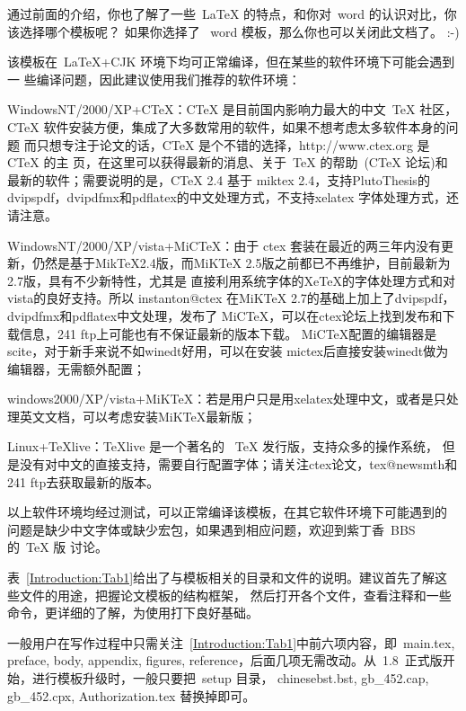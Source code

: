 通过前面的介绍，你也了解了一些~LaTeX 的特点，和你对~word 的认识对比，你该选择哪个模板呢？
如果你选择了 ~word 模板，那么你也可以关闭此文档了。 :-)

该模板在~\LaTeX{}+CJK 环境下均可正常编译，但在某些的软件环境下可能会遇到一
些编译问题，因此建议使用我们推荐的软件环境：
\begin{hitlist}
\item WindowsNT/2000/XP+CTeX：CTeX 是目前国内影响力最大的中文~TeX 社区，CTeX
软件安装方便，集成了大多数常用的软件，如果不想考虑太多软件本身的问题
而只想专注于论文的话，CTeX 是个不错的选择，http://www.ctex.org 是~ CTeX 的主
页，在这里可以获得最新的消息、关于~TeX 的帮助~(CTeX
论坛)和最新的软件；需要说明的是，CTeX 2.4 基于 miktex 2.4，支持PlutoThesis的dvipspdf，dvipdfmx和pdflatex的中文处理方式，不支持xelatex 字体处理方式，还请注意。
\item WindowsNT/2000/XP/vista+MiCTeX：由于 ctex 套装在最近的两三年内没有更新，仍然是基于MikTeX2.4版，而MiKTeX 2.5版之前都已不再维护，目前最新为2.7版，具有不少新特性，尤其是 直接利用系统字体的XeTeX的字体处理方式和对vista的良好支持。所以 instanton@ctex 在MiKTeX 2.7的基础上加上了dvipspdf，dvipdfmx和pdflatex中文处理，发布了 MiCTeX，可以在ctex论坛上找到发布和下载信息，241 ftp上可能也有不保证最新的版本下载。 MiCTeX配置的编辑器是scite，对于新手来说不如winedt好用，可以在安装 mictex后直接安装winedt做为编辑器，无需额外配置；
\item windows2000/XP/vista+MiKTeX：若是用户只是用xelatex处理中文，或者是只处理英文文档，可以考虑安装MiKTeX最新版；
\item Linux+TeXlive：TeXlive 是一个著名的~ TeX 发行版，支持众多的操作系统，
但是没有对中文的直接支持，需要自行配置字体；请关注ctex论文，tex@newsmth和241 ftp去获取最新的版本。
\end{hitlist}

以上软件环境均经过测试，可以正常编译该模板，在其它软件环境下可能遇到的
问题是缺少中文字体或缺少宏包，如果遇到相应问题，欢迎到紫丁香~BBS 的~TeX 版
讨论。


表~\ref{Introduction:Tab1}给出了与模板相关的目录和文件的说明。建议首先了解这些文件的用途，把握论文模板的结构框架，
然后打开各个文件，查看注释和一些命令，更详细的了解，为使用打下良好基础。

一般用户在写作过程中只需关注~\ref{Introduction:Tab1}中前六项内容，即~main.tex, preface, body, appendix,
figures, reference，后面几项无需改动。从~1.8~正式版开始，进行模板升级时，一般只要把~setup 目录，
chinesebst.bst, gb\_452.cap, gb\_452.cpx, Authorization.tex 替换掉即可。

